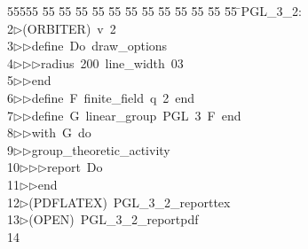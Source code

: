 %
%
\begin{tabbing}
55555 \= 55 \= 55 \= 55 \= 55 \= 55 \= 55 \= 55 \= 55 \= 55 \= 55 \= 55 \= 55 \= \>PGL\_3\_2:\\[0pt]
2\>$\triangleright$\>(ORBITER)\ v\ 2\ \\[0pt]
3\>$\triangleright$\>$\triangleright$\>define\ Do\ draw\_options\ \\[0pt]
4\>$\triangleright$\>$\triangleright$\>$\triangleright$\>radius\ 200\ line\_width\ 03\ \\[0pt]
5\>$\triangleright$\>$\triangleright$\>end\ \\[0pt]
6\>$\triangleright$\>$\triangleright$\>define\ F\ finite\_field\ q\ 2\ end\ \\[0pt]
7\>$\triangleright$\>$\triangleright$\>define\ G\ linear\_group\ PGL\ 3\ F\ end\ \\[0pt]
8\>$\triangleright$\>$\triangleright$\>with\ G\ do\ \\[0pt]
9\>$\triangleright$\>$\triangleright$\>group\_theoretic\_activity\ \\[0pt]
10\>$\triangleright$\>$\triangleright$\>$\triangleright$\>report\ Do\ \\[0pt]
11\>$\triangleright$\>$\triangleright$\>end\\[0pt]
12\>$\triangleright$\>(PDFLATEX)\ PGL\_3\_2\_reporttex\\[0pt]
13\>$\triangleright$\>(OPEN)\ PGL\_3\_2\_reportpdf\\[0pt]
14\>\end{tabbing}
